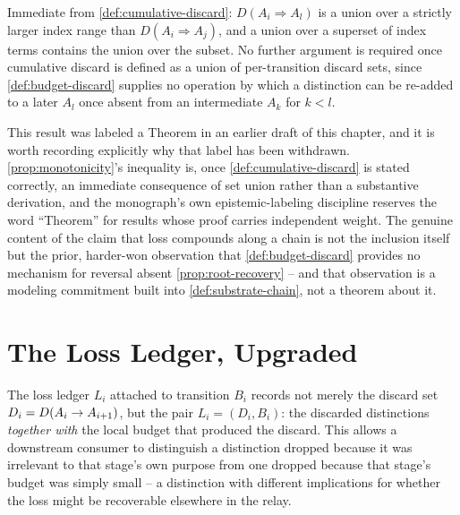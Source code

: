 \begin{proofsketch}
Immediate from \cref{def:cumulative-discard}: $D(A_i \Rightarrow A_l)$ is a
union over a strictly larger index range than $D(A_i \Rightarrow A_j)$,
and a union over a superset of index terms contains the union over the
subset. No further argument is required once cumulative discard is defined
as a union of per-transition discard sets, since \cref{def:budget-discard}
supplies no operation by which a distinction can be re-added to a later
$A_l$ once absent from an intermediate $A_k$ for $k < l$.
\end{proofsketch}

This result was labeled a Theorem in an earlier draft of this chapter, and
it is worth recording explicitly why that label has been withdrawn.
\cref{prop:monotonicity}'s inequality is, once
\cref{def:cumulative-discard} is stated correctly, an immediate consequence
of set union rather than a substantive derivation, and the monograph's own
epistemic-labeling discipline reserves the word ``Theorem'' for results
whose proof carries independent weight. The genuine content of the claim
that loss compounds along a chain is not the inclusion itself but the
prior, harder-won observation that \cref{def:budget-discard} provides no
mechanism for reversal absent \cref{prop:root-recovery} -- and that
observation is a modeling commitment built into
\cref{def:substrate-chain}, not a theorem about it.

\section{The Loss Ledger, Upgraded}

\begin{definition}
\label{def:loss-ledger}
The loss ledger $L_i$ attached to transition $B_i$ records not merely the
discard set $D_i = D(A_i \to A_{i+1})$, but the pair $L_i = (D_i,
B_i)$: the discarded distinctions \emph{together with} the local budget
that produced the discard. This allows a downstream consumer to
distinguish a distinction dropped because it was irrelevant to that
stage's own purpose from one dropped because that stage's budget was
simply small -- a distinction with different implications for whether the
loss might be recoverable elsewhere in the relay.
\end{definition}

